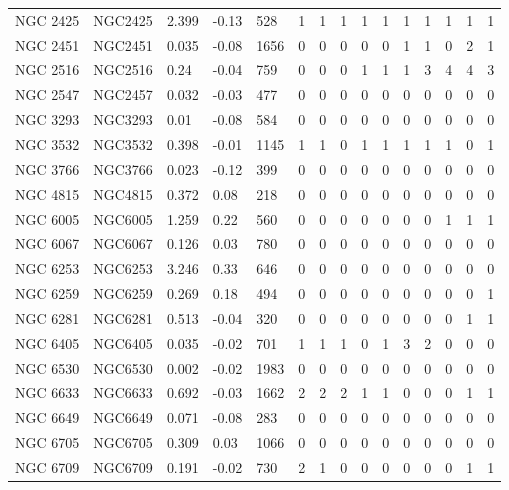 \begin{longtable}[c]{|l l l l l || c c c c c | c c c c c|}
		\rowcolor{lightgray}
		NGC 2425 & NGC2425 & 2.399 & -0.13 & 528 & 1 & 1 & 1 & 1 & 1 & 1 & 1 & 1 & 1 & 1\\
		\rowcolor{lightgray}
		NGC 2451 & NGC2451 & 0.035 & -0.08 & 1656 & 0 & 0 & 0 & 0 & 0 & 1 & 1 & 0 & 2 & 1\\
		\rowcolor{lightgray}
		NGC 2516 & NGC2516 & 0.24 & -0.04 & 759 & 0 & 0 & 0 & 1 & 1 & 1 & 3 & 4 & 4 & 3\\
		NGC 2547 & NGC2457 & 0.032 & -0.03 & 477 & 0 & 0 & 0 & 0 & 0 & 0 & 0 & 0 & 0 & 0\\
		NGC 3293 & NGC3293 & 0.01 & -0.08 & 584 & 0 & 0 & 0 & 0 & 0 & 0 & 0 & 0 & 0 & 0\\
		\rowcolor{lightgray}
		NGC 3532 & NGC3532 & 0.398 & -0.01 & 1145 & 1 & 1 & 0 & 1 & 1 & 1 & 1 & 1 & 0 & 1\\
		NGC 3766 & NGC3766 & 0.023 & -0.12 & 399 & 0 & 0 & 0 & 0 & 0 & 0 & 0 & 0 & 0 & 0\\
		NGC 4815 & NGC4815 & 0.372 & 0.08 & 218 & 0 & 0 & 0 & 0 & 0 & 0 & 0 & 0 & 0 & 0\\
		\rowcolor{lightgray}
		NGC 6005 & NGC6005 & 1.259 & 0.22 & 560 & 0 & 0 & 0 & 0 & 0 & 0 & 0 & 1 & 1 & 1\\
		NGC 6067 & NGC6067 & 0.126 & 0.03 & 780 & 0 & 0 & 0 & 0 & 0 & 0 & 0 & 0 & 0 & 0\\
		NGC 6253 & NGC6253 & 3.246 & 0.33 & 646 & 0 & 0 & 0 & 0 & 0 & 0 & 0 & 0 & 0 & 0\\
		\rowcolor{lightgray}
		NGC 6259 & NGC6259 & 0.269 & 0.18 & 494 & 0 & 0 & 0 & 0 & 0 & 0 & 0 & 0 & 0 & 1\\
		\rowcolor{lightgray}
		NGC 6281 & NGC6281 & 0.513 & -0.04 & 320 & 0 & 0 & 0 & 0 & 0 & 0 & 0 & 0 & 1 & 1\\
		\rowcolor{lightgray}
		NGC 6405 & NGC6405 & 0.035 & -0.02 & 701 & 1 & 1 & 1 & 0 & 1 & 3 & 2 & 0 & 0 & 0\\
		NGC 6530 & NGC6530 & 0.002 & -0.02 & 1983 & 0 & 0 & 0 & 0 & 0 & 0 & 0 & 0 & 0 & 0\\
		\rowcolor{lightgray}
		NGC 6633 & NGC6633 & 0.692 & -0.03 & 1662 & 2 & 2 & 2 & 1 & 1 & 0 & 0 & 0 & 1 & 1\\
		NGC 6649 & NGC6649 & 0.071 & -0.08 & 283 & 0 & 0 & 0 & 0 & 0 & 0 & 0 & 0 & 0 & 0\\
		NGC 6705 & NGC6705 & 0.309 & 0.03 & 1066 & 0 & 0 & 0 & 0 & 0 & 0 & 0 & 0 & 0 & 0\\
		\rowcolor{lightgray}
		NGC 6709 & NGC6709 & 0.191 & -0.02 & 730 & 2 & 1 & 0 & 0 & 0 & 0 & 0 & 0 & 1 & 1\\

\end{longtable}
